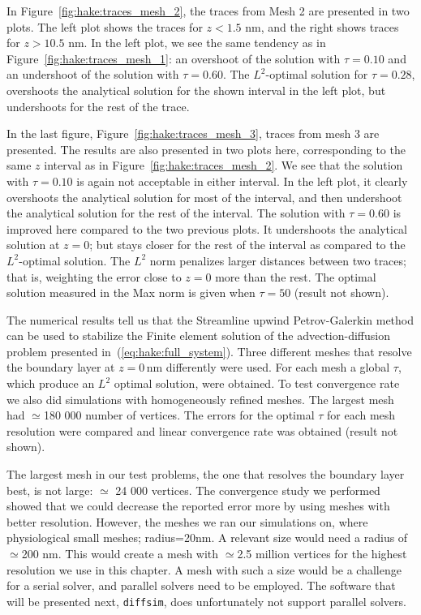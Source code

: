 In Figure~\ref{fig:hake:traces_mesh_2}, the traces from Mesh 2 are
presented in two plots. The left plot shows the traces for $z<1.5$ nm,
and the right shows traces for $z>10.5$ nm. In the left plot, we see
the same tendency as in Figure~\ref{fig:hake:traces_mesh_1}: an
overshoot of the solution with $\tau=0.10$ and an undershoot of the
solution with $\tau=0.60$. The $L^2$-optimal solution for $\tau=0.28$,
overshoots the analytical solution for the shown interval in the left
plot, but undershoots for the rest of the trace.

In the last figure, Figure~\ref{fig:hake:traces_mesh_3}, traces from
mesh 3 are presented. The results are also presented in two plots
here, corresponding to the same $z$ interval as in
Figure~\ref{fig:hake:traces_mesh_2}. We see that the solution with
$\tau=0.10$ is again not acceptable in either interval. In the left
plot, it clearly overshoots the analytical solution for most of the
interval, and then undershoot the analytical solution for the rest of
the interval. The solution with $\tau=0.60$ is improved here compared
to the two previous plots. It undershoots the analytical solution at
$z=0$; but stays closer for the rest of the interval as compared to
the $L^2$-optimal solution. The $L^2$ norm penalizes larger distances
between two traces; that is, weighting the error close to $z=0$ more
than the rest. The optimal solution measured in the Max norm is given
when $\tau=50$ (result not shown).

The numerical results tell us that the Streamline upwind
Petrov-Galerkin method can be used to stabilize the Finite element
solution of the advection-diffusion problem presented
in~(\ref{eq:hake:full_system}). Three different meshes that resolve
the boundary layer at $z=0\,\mathrm{nm}$ differently were used. For
each mesh a global $\tau$, which produce an $L^2$ optimal solution,
were obtained. To test convergence rate we also did simulations with
homogeneously refined meshes. The largest mesh had $\simeq$180 000
number of vertices. The errors for the optimal $\tau$ for each mesh
resolution were compared and linear convergence rate was obtained
(result not shown).

The largest mesh in our test problems, the one that resolves the
boundary layer best, is not large: $\simeq$ 24 000 vertices. The
convergence study we performed showed that we could decrease the
reported error more by using meshes with better resolution. However,
the meshes we ran our simulations on, where physiological small
meshes; radius=20nm. A relevant size would need a radius of
$\simeq$200 nm. This would create a mesh with $\simeq$2.5 million
vertices for the highest resolution we use in this chapter. A mesh
with such a size would be a challenge for a serial solver, and
parallel solvers need to be employed. The software that will be
presented next, \texttt{diffsim}, does unfortunately not support
parallel solvers.

